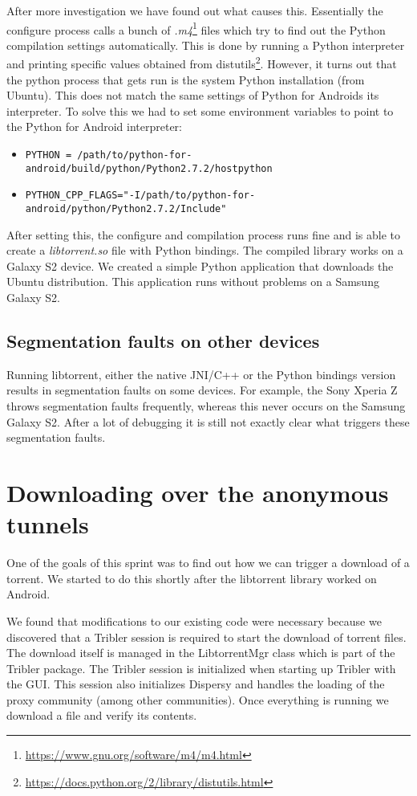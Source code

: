 			After more investigation we have found out what causes this. Essentially the configure process calls a bunch of \emph{.m4}\footnote{\url{https://www.gnu.org/software/m4/m4.html}} files which try to find out the Python compilation settings automatically. This is done by running a Python interpreter and printing specific values obtained from distutils\footnote{\url{https://docs.python.org/2/library/distutils.html}}. However, it turns out that the python process that gets run is the system Python installation (from Ubuntu). This does not match the same settings of Python for Androids its interpreter. To solve this we had to set some environment variables to point to the Python for Android interpreter:
			
			\begin{itemize}
				\item \texttt{PYTHON = /path/to/python-for-android/build/python/Python2.7.2/hostpython}
				\item \texttt{PYTHON\_CPP\_FLAGS="-I/path/to/python-for-android/python/Python2.7.2/Include"}
			\end{itemize}
			
			After setting this, the configure and compilation process runs fine and is able to create a \emph{libtorrent.so} file with Python bindings. The compiled library works on a Galaxy S2 device. We created a simple Python application that downloads the Ubuntu distribution. This application runs without problems on a Samsung Galaxy S2.
			
		\subsection{Segmentation faults on other devices}
			Running libtorrent, either the native JNI/C++ or the Python bindings version results in segmentation faults on some devices. For example, the Sony Xperia Z throws segmentation faults frequently, whereas this never occurs on the Samsung Galaxy S2.  After a lot of debugging it is still not exactly clear what triggers these segmentation faults.
		
	\section{Downloading over the anonymous tunnels}
	One of the goals of this sprint was to find out how we can trigger a download of a torrent. We started to do this shortly after the libtorrent library worked on Android.
	
	We found that modifications to our existing code were necessary because we discovered that a Tribler session is required to start the download of torrent files. The download itself is managed in the LibtorrentMgr class which is part of the Tribler package. The Tribler session is initialized when starting up Tribler with the GUI. This session also initializes Dispersy and handles the loading of the proxy community (among other communities). Once everything is running we download a file and verify its contents.
	
